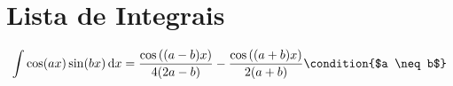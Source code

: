 \documentclass[a4paper,12pt, leqno, answers]{exam}
\begin{document}
\section{Lista de Integrais}
\begin{dmath}[label={ti:80}]
  \int \cos(a x) \sin(b x) \vi{x} = \frac{\cos\left( (a - b) x \right)}{4 (2 a -
  b)} - \frac{\cos\left( (a + b) x \right)}{2 (a + b)} \condition{$a \neq b$}
\end{dmath}

% 
% 
\end{document}

